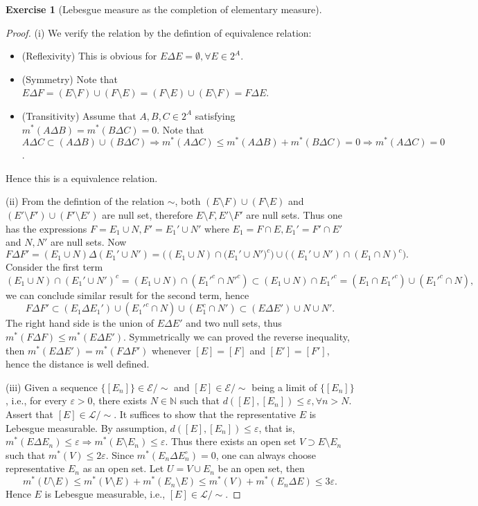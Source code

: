 \documentclass[a4paper]{article}
\newtheorem{ex}{Exercise}[subsection]
\begin{document}
\begin{ex}[Lebesgue measure as the completion of elementary measure]\end{ex}
\begin{proof}
(i) We verify the relation by the defintion of equivalence relation:\begin{itemize}
    \item (Reflexivity) This is obvious for $E \Delta E = \emptyset, \forall E \in 2^A$.
    \item (Symmetry) Note that $E \Delta F = (E \setminus F) \cup (F \setminus E) = (F \setminus E) \cup(E \setminus F) = F \Delta E$.
    \item (Transitivity) Assume that $A, B, C \in 2^A$ satisfying $m^*(A \Delta B) = m^*(B \Delta C) = 0$. Note
    that $A \Delta C \subset (A \Delta B) \cup (B \Delta C) \Rightarrow  m^*(A \Delta C) \leq m^*(A \Delta B)
    + m^*(B \Delta C) = 0 \Rightarrow m^*(A \Delta C) = 0$.
\end{itemize}
Hence this is a equivalence relation.

(ii) From the defintion of the relation $\sim$, both $(E \setminus F) \cup (F \setminus E)$ and 
$(E' \setminus F') \cup (F' \setminus E')$ are null set, therefore $E \setminus F, E' \setminus F'$ are null
sets. Thus one has the expressions $F = E_1 \cup N, F' = E_1' \cup N'$ where $E_1 = F \cap E, E_1' = F' \cap E'$ and
$N, N'$ are null sets. Now $$
F \Delta F' = (E_1 \cup N) \Delta (E_1' \cup N') = \big((E_1 \cup N) \cap \big(E_1' \cup N')^c\big) \cup 
\big((E_1' \cup N') \cap (E_1 \cap N)^c\big).
$$Consider the first term$$
(E_1 \cup N) \cap (E_1' \cup N')^c = (E_1 \cup N) \cap (E_1'^c \cap N'^c) \subset (E_1 \cup N) \cap E_1'^c
= (E_1 \cap E_1'^c) \cup (E_1'^c \cap N),
$$we can conclude similar result for the second term, hence $$
F \Delta F' \subset (E_1 \Delta E_1') \cup (E_1'^c \cap N) \cup (E_1^c \cap N') \subset (E \Delta E') \cup N \cup N'.
$$The right hand side is the union of $E \Delta E'$ and two null sets, thus $m^*(F \Delta F) \leq m^*(E \Delta E')$.
Symmetrically we can proved the reverse inequality, then $m^*(E \Delta E') = m^*(F \Delta F')$ whenever $[E] = [F]$
and $[E'] = [F']$, hence the distance is well defined.

(iii) Given a sequence $\{[E_n]\} \in \mathcal{E} / \sim$ and $[E] \in \mathcal{E} /\sim$ being a limit of $\{[E_n]\}$,
i.e., for every $\varepsilon > 0$, there exists $N \in \mathbb{N}$ such that $d([E], [E_n]) \leq \varepsilon, \forall n > N$.
Assert that $[E] \in \mathcal{L} / \sim$. It suffices to show that the representative $E$ is Lebesgue measurable.
By assumption, $d([E], [E_n]) \leq \varepsilon$, that is, $m^*(E \Delta E_n) \leq \varepsilon \Rightarrow
m^*(E \setminus E_n) \leq \varepsilon$. Thus there exists an open set $V \supset E \setminus E_n$ such that 
$m^*(V) \leq 2\varepsilon$. Since $m^*(E_n \Delta E_n^\circ) = 0$, one can always choose representative $E_n$ as
an open set. Let $U = V \cup E_n$ be an open set, then $$
m^*(U \setminus E) \leq m^*(V \setminus E) + m^*(E_n \setminus E) \leq m^*(V) + m^*(E_n \Delta E) \leq 3\varepsilon.
$$Hence $E$ is Lebesgue measurable, i.e., $[E] \in \mathcal{L} / \sim$.


\end{proof}
\end{document}
